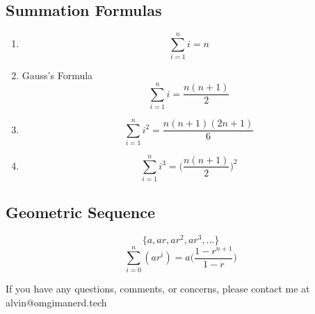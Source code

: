 \documentclass[letterpaper, 12pt]{math}
\begin{document}
\subsection*{Summation Formulas}
\begin{enumerate}
  \item
    \[ \sum_{i=1}^{n}i = n \]
  \item Gauss's Formula
    \[ \sum_{i=1}^{n}i = \frac{n(n+1)}{2} \]
  \item
    \[ \sum_{i=1}^{n}i^{2} = \frac{n(n+1)(2n+1)}{6} \]
  \item
    \[ \sum_{i=1}^{n}i^{3} = \bigg(\frac{n(n+1)}{2}\bigg)^{2} \]
\end{enumerate}

\subsection*{Geometric Sequence}
\[ \{a,ar,ar^{2},ar^{3},\dots\} \]
\[ \sum_{i=0}^{n}(ar^{i}) = a\bigg(\frac{1-r^{n+1}}{1-r}\bigg) \]

\begin{center}
  If you have any questions, comments, or concerns, please contact me at
  alvin@omgimanerd.tech
\end{center}
\end{document}
